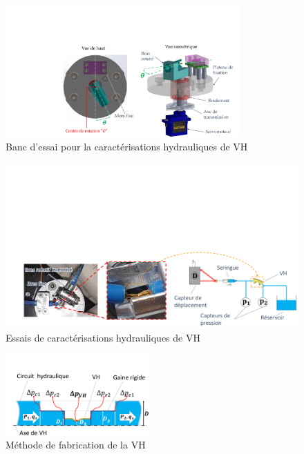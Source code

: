 \documentclass[3p,twocolumn,preprint]{elsarticle}
\begin{document}
\begin{figure}[!htb]
\begin{center}
	\captionsetup{justification=centering} 
	\includegraphics[trim={8cm 0cm 0cm 5cm},clip,width=0.8\textwidth]{figures/BDT_hydraulique_VH.pdf}
	\caption{Banc d'essai pour la caractérisations hydrauliques de VH}
	\label{fig:BDT_hydraulique_VH}
\end{center}	
\end{figure}    
\begin{figure}[!htb]
\begin{center}
	\captionsetup{justification=centering} 
	\includegraphics[trim={2cm 0cm 0cm 10cm},clip,width=\textwidth]{figures/essais_hydraulique_VH.pdf}
	\caption{Essais de caractérisations hydrauliques de VH}
	\label{fig:essais_hydraulique_VH}
\end{center}	
\end{figure}    
\begin{figure}[!htb]
\begin{center}
	\captionsetup{justification=centering} 
	\includegraphics[trim={2cm 0cm 0cm 4cm},clip,width=0.49\textwidth]{figures/fabrication_tube_experimental.pdf}
	\caption{Méthode de fabrication de la VH}
	\label{fig:fabrication_tube_experimental}
\end{center}	
\end{figure}    
\end{document}

